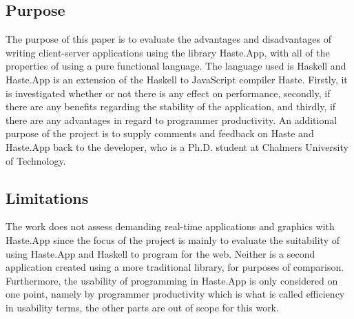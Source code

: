 \documentclass[a4paper]{article}
\begin{document}
\subsection{Purpose}
\label{sec:purpose}
The purpose of this paper is to evaluate the advantages and disadvantages of writing client-server applications using the library Haste.App, with all of the properties of using a pure functional language. The language used is Haskell and Haste.App is an extension of the Haskell to JavaScript compiler Haste. Firstly, it is investigated whether or not there is any effect on performance, secondly, if there are any benefits regarding the stability of the application, and thirdly, if there are any advantages in regard to programmer productivity. An additional purpose of the project is to supply comments and feedback on Haste and Haste.App back to the developer, who is a Ph.D. student at Chalmers University of Technology.

\subsection{Limitations}
\label{sec:limitations}
The work does not assess demanding real-time applications and graphics with Haste.App since the focus of the project is mainly to evaluate the suitability of using Haste.App and Haskell to program for the web. Neither is a second application created using a more traditional library, for purposes of comparison. Furthermore, the usability \cite{usability} of programming in Haste.App is only considered on one point, namely by programmer productivity which is what is called efficiency in usability terms, the other parts are out of scope for this work. 


\end{document}
